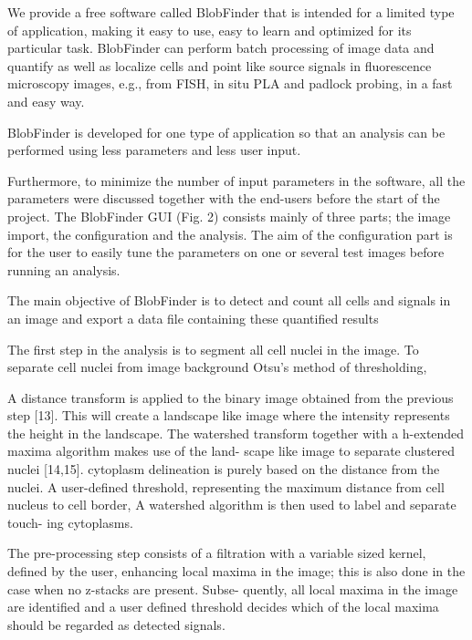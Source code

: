 

We provide a free software called BlobFinder that is intended for a limited
type of application, making it easy to use, easy to learn and optimized for its
particular task. BlobFinder can perform batch processing of image data and
quantify as well as localize cells and point like source signals in fluorescence
microscopy images, e.g., from FISH, in situ PLA and padlock probing, in a fast and easy way.

BlobFinder is developed for one type of application so that an analysis can be performed using less parameters and less user input.

Furthermore, to minimize the number of input parameters in the software, all
the parameters were discussed together with the end-users before the start of the project.
The BlobFinder GUI (Fig. 2) consists mainly of three parts; the image import,
the configuration and the analysis. The aim of the configuration part is for
the user to easily tune the parameters on one or several test images before running an analysis.

The main objective of BlobFinder is to detect and count all cells and signals in an image and export a data file containing these quantified results

The first step in the analysis is to segment all cell nuclei in the image.
To separate cell nuclei from image background Otsu’s method of thresholding,

A distance transform is applied to the binary image obtained from the previous step [13].
This will create a landscape like image where the intensity represents the height in the landscape. The watershed transform together
with a h-extended maxima algorithm makes use of the land- scape like image to separate clustered nuclei [14,15].
cytoplasm delineation is purely based on the distance from the nuclei.
A user-defined threshold, representing the maximum distance from cell nucleus to cell border,
A watershed algorithm is then used to label and separate touch- ing cytoplasms.

The pre-processing step consists of a filtration with a variable sized kernel,
defined by the user, enhancing local maxima in the image; this is also done in
the case when no z-stacks are present. Subse- quently, all local maxima in the
image are identified and a user defined threshold decides which of the local maxima should be regarded as detected signals.

